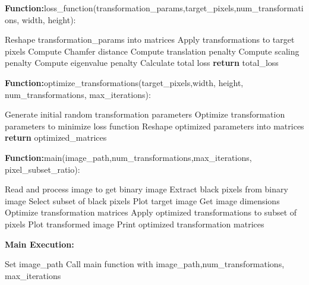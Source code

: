 \documentclass[a4paper,11pt, titlepage]{article}
\theoremstyle{definition}
\theoremstyle{plain}
\theoremstyle{remark}
\theoremstyle{definition}
\begin{document}
\begin{algorithm}
\textbf{Function:}loss\_function(transformation\_params,target\_pixels,num\_transformations, width, height):
\begin{algorithmic}[1]
\STATE Reshape transformation\_params into matrices
\STATE Apply transformations to target pixels
\STATE Compute Chamfer distance
\STATE Compute translation penalty
\STATE Compute scaling penalty
\STATE Compute eigenvalue penalty
\STATE Calculate total loss
\STATE \textbf{return} total\_loss
\end{algorithmic}

\textbf{Function:}optimize\_transformations(target\_pixels,width, height, num\_transformations, max\_iterations):
\begin{algorithmic}[1]
\STATE Generate initial random transformation parameters
\STATE Optimize transformation parameters to minimize loss function
\STATE Reshape optimized parameters into matrices
\STATE \textbf{return} optimized\_matrices
\end{algorithmic}

\textbf{Function:}main(image\_path,num\_transformations,max\_iterations, pixel\_subset\_ratio):
\begin{algorithmic}[1]
\STATE Read and process image to get binary image
\STATE Extract black pixels from binary image
\STATE Select subset of black pixels
\STATE Plot target image
\STATE Get image dimensions
\STATE Optimize transformation matrices
\STATE Apply optimized transformations to subset of pixels
\STATE Plot transformed image
\STATE Print optimized transformation matrices
\end{algorithmic}

\textbf{Main Execution:}
\begin{algorithmic}[1]
\STATE Set image\_path
\STATE Call main function with image\_path,num\_transformations, max\_iterations
\end{algorithmic}

\end{algorithm}
\end{document}
